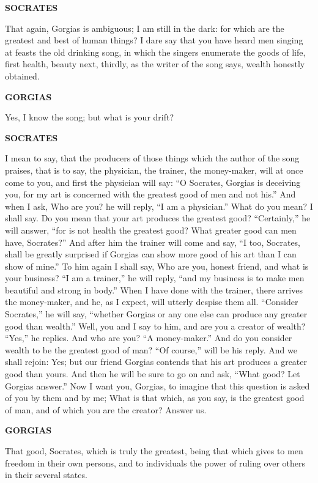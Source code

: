 \documentclass[11pt,letter]{article}
\begin{document}
\par \textbf{SOCRATES}
\par   That again, Gorgias is ambiguous; I am still in the dark:  for which are the greatest and best of human things? I dare say that you have heard men singing at feasts the old drinking song, in which the singers enumerate the goods of life, first health, beauty next, thirdly, as the writer of the song says, wealth honestly obtained.

\par \textbf{GORGIAS}
\par   Yes, I know the song; but what is your drift?

\par \textbf{SOCRATES}
\par   I mean to say, that the producers of those things which the author of the song praises, that is to say, the physician, the trainer, the money-maker, will at once come to you, and first the physician will say:  “O Socrates, Gorgias is deceiving you, for my art is concerned with the greatest good of men and not his.” And when I ask, Who are you? he will reply, “I am a physician.” What do you mean? I shall say. Do you mean that your art produces the greatest good? “Certainly,” he will answer, “for is not health the greatest good? What greater good can men have, Socrates?” And after him the trainer will come and say, “I too, Socrates, shall be greatly surprised if Gorgias can show more good of his art than I can show of mine.” To him again I shall say, Who are you, honest friend, and what is your business? “I am a trainer,” he will reply, “and my business is to make men beautiful and strong in body.” When I have done with the trainer, there arrives the money-maker, and he, as I expect, will utterly despise them all. “Consider Socrates,” he will say, “whether Gorgias or any one else can produce any greater good than wealth.” Well, you and I say to him, and are you a creator of wealth? “Yes,” he replies. And who are you? “A money-maker.” And do you consider wealth to be the greatest good of man? “Of course,” will be his reply. And we shall rejoin:  Yes; but our friend Gorgias contends that his art produces a greater good than yours. And then he will be sure to go on and ask, “What good? Let Gorgias answer.” Now I want you, Gorgias, to imagine that this question is asked of you by them and by me; What is that which, as you say, is the greatest good of man, and of which you are the creator? Answer us.

\par \textbf{GORGIAS}
\par   That good, Socrates, which is truly the greatest, being that which gives to men freedom in their own persons, and to individuals the power of ruling over others in their several states.
\end{document}

